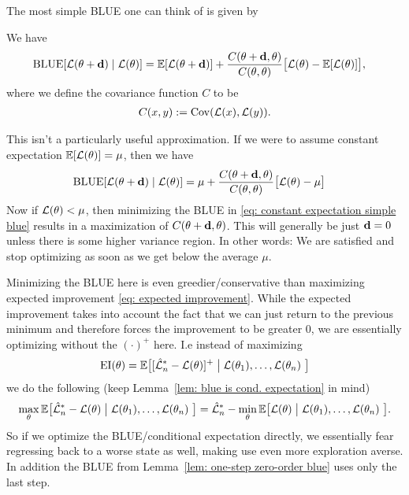 The most simple BLUE one can think of is given by

\begin{lemma}\label{lem: one-step zero-order blue}
	We have
	\begin{align*}
		\operatorname{BLUE}[\mathcal{L}(\theta + \mathbf{d}) \mid \mathcal{L}(\theta)]
		&= \mathbb{E}[\mathcal{L}(\theta + \mathbf{d})]
		+ \frac{C(\theta+\mathbf{d},\theta)}{C(\theta, \theta)}
		\big[\mathcal{L}(\theta) - \mathbb{E}[\mathcal{L}(\theta)]\big],
	\end{align*}
	where we define the covariance function \(C\) to be
	\begin{align*}
		C(x,y):= \operatorname{Cov}(\mathcal{L}(x), \mathcal{L}(y)).
	\end{align*}
\end{lemma}

This isn't a particularly useful approximation. If we were to assume constant
expectation \(\mathbb{E}[\mathcal{L}(\theta)] = \mu\), then we have
\begin{align}\label{eq: constant expectation simple blue}
	\operatorname{BLUE}[\mathcal{L}(\theta + \mathbf{d}) \mid \mathcal{L}(\theta)]
	&=\mu 
	+ \frac{C(\theta+\mathbf{d},\theta)}{C(\theta, \theta)}
	\big[\mathcal{L}(\theta) - \mu\big]
\end{align}
Now if \(\mathcal{L}(\theta) < \mu\), then minimizing the BLUE in
\eqref{eq: constant expectation simple blue} results in a maximization of
\(C(\theta+\mathbf{d}, \theta)\). This will generally be just \(\mathbf{d}=0\) unless
there is some higher variance region. In other words: We are satisfied and
stop optimizing as soon as we get below the average \(\mu\).

Minimizing the BLUE here is even greedier/conservative than maximizing
expected improvement \eqref{eq: expected improvement}. While the expected
improvement takes into account the fact that we can just return to the previous
minimum and therefore forces the improvement to be greater \(0\), we are
essentially optimizing without the \((\cdot)^+\) here. I.e instead of
maximizing
\begin{align*}
	\operatorname{EI}(\theta) = \mathbb{E}\big[
			[\hat{\mathcal{L}}_n^*- \mathcal{L}(\theta)]^+
			\bigm|
			\mathcal{L}(\theta_1),\dots, \mathcal{L}(\theta_n)\
		\big]
\end{align*}
we do the following (keep Lemma~\ref{lem: blue is cond. expectation} in mind)
\begin{align*}
	\max_{\theta} \mathbb{E}\big[
		\hat{\mathcal{L}}_n^*- \mathcal{L}(\theta)
		\bigm|
		\mathcal{L}(\theta_1),\dots, \mathcal{L}(\theta_n)\
	\big]
	= \hat{\mathcal{L}}_n^* - \min_{\theta} \mathbb{E}\big[
		\mathcal{L}(\theta)
		\bigm|
		\mathcal{L}(\theta_1),\dots, \mathcal{L}(\theta_n)\
	\big].
\end{align*}
So if we optimize the BLUE/conditional expectation directly, we essentially fear
regressing back to a worse state as well, making use even more exploration
averse. In addition the BLUE from Lemma~\ref{lem: one-step zero-order blue}
uses only the last step.


